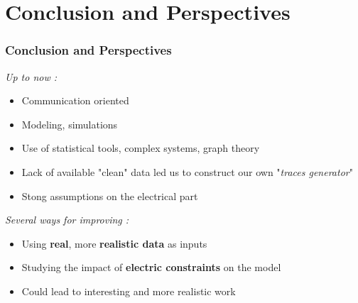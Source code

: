 \documentclass[xcolor=dvipsnames]{beamer}
\begin{document}
\section{Conclusion and Perspectives}
\begin{frame}
	\frametitle{Conclusion and Perspectives}

	\textit{Up to now :}
	\begin{itemize}
		\item Communication oriented
		\item Modeling, simulations
		\item Use of statistical tools, complex systems, graph theory
		\item Lack of available "clean" data led us to construct our own "\textit{traces generator}"
		\item Stong assumptions on the electrical part
	\end{itemize}
	
	\textit{Several ways for improving :}
	\begin{itemize}
		\item Using \textbf{real}, more \textbf{realistic data} as inputs
		\item Studying the impact of \textbf{electric constraints} on the model 
		\item Could lead to interesting and more realistic work
	\end{itemize}		
	
\end{frame}
\end{document}
